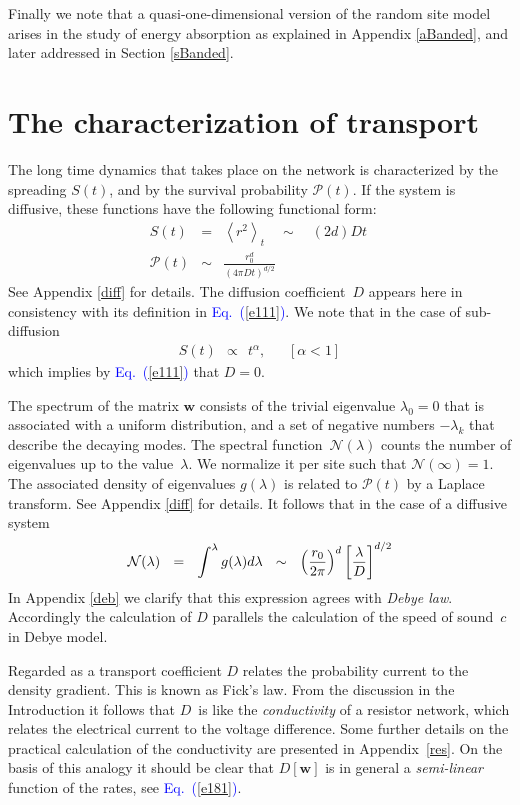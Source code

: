 \documentclass[aps,pre,floats,floatfix,twocolumn]{revtex4}
\newcommand{\mylabel}[1]{\label{#1}}
\newcommand{\beq}{\begin{eqnarray}}
\newcommand{\eeq}{\end{eqnarray}}
\newcommand{\be}[1]{\begin{eqnarray}\ifthenelse{#1=-1}
{\nonumber}{\ifthenelse{#1=0}{}{\mylabel{e#1}}}}
\newcommand{\Eq}[1]{\textcolor{blue}{Eq.\!\!~(\ref{#1})}}
\newcommand{\rmrk}[1]{#1}
\begin{document}
Finally we note that a quasi-one-dimensional version 
of the random site model arises in the study 
of energy absorption as explained in Appendix \ref{aBanded}, 
and later addressed in Section \ref{sBanded}.    


\section{The characterization of transport}

The long time dynamics that takes place on the network 
is characterized by the spreading $S(t)$, 
and by the survival probability $\mathcal{P}(t)$.
If the system is diffusive, these functions
have the following functional form: 
%
\beq
S(t) &=& \left\langle r^2\right\rangle_t \quad\sim\quad  (2d)Dt\ \\
\mathcal{P}(t) &\sim&  \frac{r_0^d}{\left({4\pi D t}\right)^{d/2}} 
\eeq
%
See Appendix \ref{diff} for details. The diffusion 
coefficient~$D$ appears here \rmrk{in consistency with 
its definition} in \Eq{e111}. 
\rmrk{We note that in the case of sub-diffusion} 
%
\beq
S(t) \ \ \propto \ \ t^{\alpha}, 
\ \ \ \ \ \ \ [\alpha<1]
\eeq
%
which implies by \Eq{e111} that ${D=0}$.


\rmrk{The spectrum} of the matrix $\bm{w}$ consists 
of the trivial eigenvalue $\lambda_0=0$ that is 
associated with a uniform distribution,   
and a set of negative numbers $-\lambda_k$
that describe the decaying modes.   
The spectral function~$\mathcal{N}(\lambda)$ 
counts the number of eigenvalues up to the value~$\lambda$.
We normalize it per site such that ${\mathcal{N}(\infty)=1}$.
The associated density of eigenvalues $g(\lambda)$ 
is related to $\mathcal{P}(t)$ by a Laplace transform.
See Appendix \ref{diff} for details.
It follows that in the case of a diffusive system 
%
\be{6}
\mathcal{N}(\lambda) \ \ = \ \ \int^\lambda g(\lambda)d\lambda  
\ \ \sim \ \ \left(\frac{r_0}{2\pi}\right)^d\left[\frac{\lambda}{D}\right]^{d/2} 
\eeq
%
\rmrk{In Appendix \ref{deb} we clarify that this 
expression agrees with {\em Debye law}. 
Accordingly the calculation of $D$ parallels 
the calculation of the speed of sound~$c$ in Debye model.} 


Regarded as a transport coefficient $D$ relates 
the probability current to the density gradient.
This is known as Fick's law. 
From the discussion in the Introduction
it follows that $D$~is like the {\em conductivity} 
of a resistor network, which relates the 
electrical current to the voltage difference. 
Some further details on the practical calculation 
of the conductivity are presented in Appendix~\ref{res}. 
On the basis of this analogy it should be clear 
that $D[\bm{w}]$ is in general a {\em semi-linear} 
function of the rates, see \Eq{e181}. 
\end{document}
